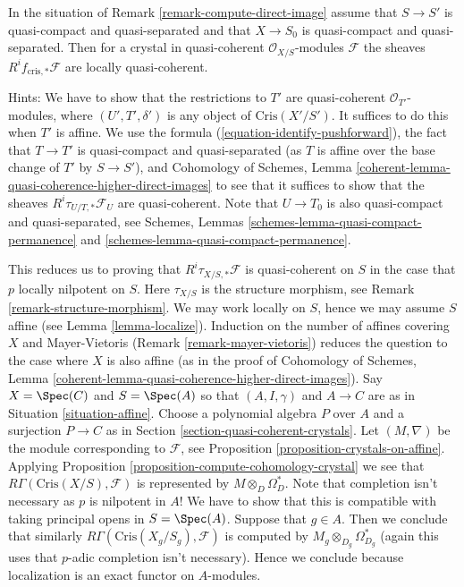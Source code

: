 \begin{remark}
\label{remark-quasi-coherent}
In the situation of Remark \ref{remark-compute-direct-image}
assume that $S \to S'$ is quasi-compact and quasi-separated and
that $X \to S_0$ is quasi-compact and quasi-separated. Then for a crystal
in quasi-coherent $\mathcal{O}_{X/S}$-modules $\mathcal{F}$
the sheaves $R^if_{\text{cris}, *}\mathcal{F}$ are locally quasi-coherent.

\medskip\noindent
Hints: We have to show that the restrictions to $T'$ are quasi-coherent
$\mathcal{O}_{T'}$-modules, where $(U', T', \delta')$ is any object of
$\text{Cris}(X'/S')$. It suffices to do this when $T'$ is affine.
We use the formula (\ref{equation-identify-pushforward}),
the fact that $T \to T'$ is quasi-compact and quasi-separated (as $T$
is affine over the base change of $T'$ by $S \to S'$), and
Cohomology of Schemes, Lemma
\ref{coherent-lemma-quasi-coherence-higher-direct-images}
to see that it suffices to show that the sheaves
$R^i\tau_{U/T, *}\mathcal{F}_U$ are quasi-coherent.
Note that $U \to T_0$ is also quasi-compact and quasi-separated, see
Schemes, Lemmas \ref{schemes-lemma-quasi-compact-permanence} and
\ref{schemes-lemma-quasi-compact-permanence}.

\medskip\noindent
This reduces us to proving that $R^i\tau_{X/S, *}\mathcal{F}$
is quasi-coherent on $S$ in the case that $p$ locally nilpotent on $S$. Here
$\tau_{X/S}$ is the structure morphism, see
Remark \ref{remark-structure-morphism}.
We may work locally on $S$, hence we may assume $S$ affine
(see Lemma \ref{lemma-localize}). Induction on the number
of affines covering $X$ and Mayer-Vietoris
(Remark \ref{remark-mayer-vietoris}) reduces the question to
the case where $X$ is also affine (as in the proof of
Cohomology of Schemes, Lemma
\ref{coherent-lemma-quasi-coherence-higher-direct-images}).
Say $X = \Spec(C)$ and $S = \Spec(A)$ so that $(A, I, \gamma)$ and
$A \to C$ are as
in Situation \ref{situation-affine}. Choose a polynomial algebra
$P$ over $A$ and a surjection $P \to C$ as in
Section \ref{section-quasi-coherent-crystals}.
Let $(M, \nabla)$ be the module corresponding to $\mathcal{F}$, see
Proposition \ref{proposition-crystals-on-affine}.
Applying 
Proposition \ref{proposition-compute-cohomology-crystal}
we see that $R\Gamma(\text{Cris}(X/S), \mathcal{F})$ is represented by
$M \otimes_D \Omega_D^*$. Note that completion isn't necessary
as $p$ is nilpotent in $A$! We have to show that this is compatible
with taking principal opens in $S = \Spec(A)$. Suppose that $g \in A$.
Then we conclude that similarly $R\Gamma(\text{Cris}(X_g/S_g), \mathcal{F})$
is computed by $M_g \otimes_{D_g} \Omega_{D_g}^*$ (again this uses that
$p$-adic completion isn't necessary). Hence we conclude because localization
is an exact functor on $A$-modules.
\end{remark}

